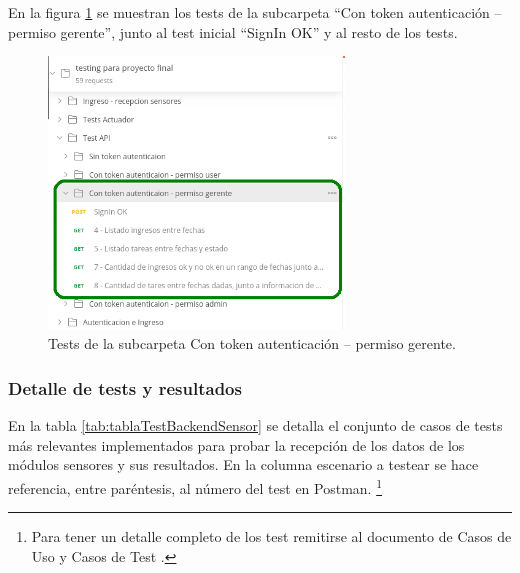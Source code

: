 En la figura \ref{fig:TestBackendGerente} se muestran los tests de la subcarpeta ``Con token autenticación – permiso gerente'', junto al test inicial ``SignIn OK'' y al resto de los tests.

\begin{figure}[ht]
	\centering
	\includegraphics[width=0.7\textwidth]{./Figures/TestBackendGerente.png}
	\caption{Tests de la subcarpeta Con token autenticación – permiso gerente.}
	\label{fig:TestBackendGerente}
\end{figure}

\pagebreak
\subsubsection{Detalle de tests y resultados}

En la tabla  \ref{tab:tablaTestBackendSensor} se detalla el conjunto de casos de tests más relevantes implementados para probar la recepción de los datos de los módulos sensores y sus resultados. En la columna escenario a testear se hace referencia, entre paréntesis, al número del test en Postman.  \footnote{Para tener un detalle completo de los test remitirse al documento de Casos de Uso y Casos de Test \citep{WEBSITE:CasosUsoYTest}.}


